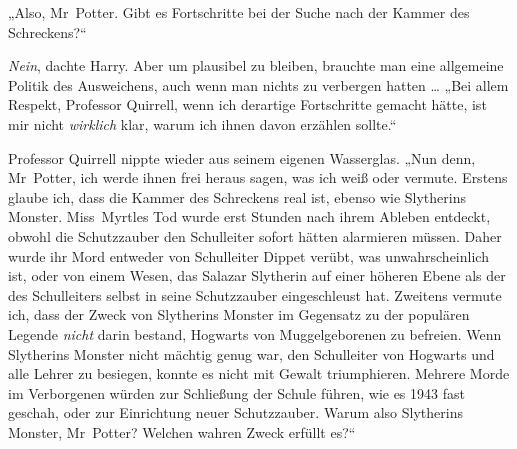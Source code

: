 „Also, Mr~Potter. Gibt es Fortschritte bei der Suche nach der Kammer des Schreckens?“

\emph{Nein}, dachte Harry. Aber um plausibel zu bleiben, brauchte man eine allgemeine Politik des Ausweichens, auch wenn man nichts zu verbergen hatten …
„Bei allem Respekt, Professor Quirrell, wenn ich derartige Fortschritte gemacht hätte, ist mir nicht \emph{wirklich} klar, warum ich ihnen davon erzählen sollte.“

Professor Quirrell nippte wieder aus seinem eigenen Wasserglas.
„Nun denn, Mr~Potter, ich werde ihnen frei heraus sagen, was ich weiß oder vermute. Erstens glaube ich, dass die Kammer des Schreckens real ist, ebenso wie Slytherins Monster. Miss~Myrtles Tod wurde erst Stunden nach ihrem Ableben entdeckt, obwohl die Schutzzauber den Schulleiter sofort hätten alarmieren müssen. Daher wurde ihr Mord entweder von Schulleiter Dippet verübt, was unwahrscheinlich ist, oder von einem Wesen, das Salazar Slytherin auf einer höheren Ebene als der des Schulleiters selbst in seine Schutzzauber eingeschleust hat. Zweitens vermute ich, dass der Zweck von Slytherins Monster im Gegensatz zu der populären Legende \emph{nicht} darin bestand, Hogwarts von Muggelgeborenen zu befreien. Wenn Slytherins Monster nicht mächtig genug war, den Schulleiter von Hogwarts und alle Lehrer zu besiegen, konnte es nicht mit Gewalt triumphieren. Mehrere Morde im Verborgenen würden zur Schließung der Schule führen, wie es 1943 fast geschah, oder zur Einrichtung neuer Schutzzauber. Warum also Slytherins Monster, Mr~Potter? Welchen wahren Zweck erfüllt es?“

